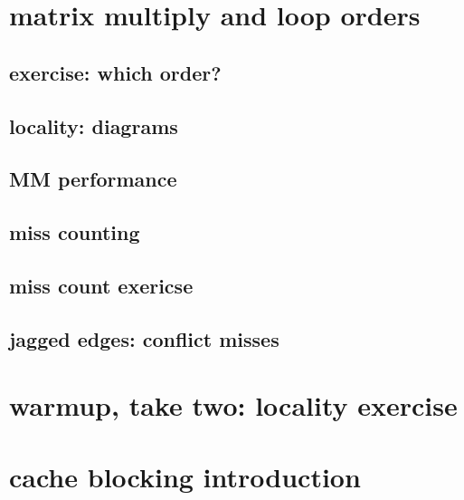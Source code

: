 \section{matrix multiply and loop orders}

%


\subsection{exercise: which order?}

\subsection{locality: diagrams}



\subsection{MM performance}


\subsection{miss counting}


\subsection{miss count exericse}


\subsection{jagged edges: conflict misses} %



\section{warmup, take two: locality exercise}


\section{cache blocking introduction}
%
